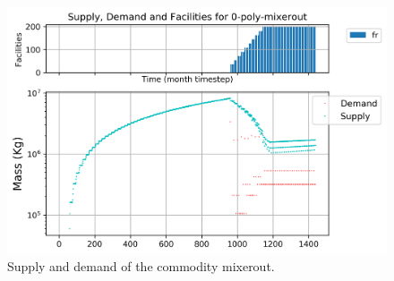 \documentclass[11pt]{article}
\begin{document}
\begin{figure}[H]
	\centering
	\includegraphics[width=\textwidth]{23-figures/0-poly-mixerout.png} 
	\hfill
	\caption{Supply and demand of the commodity mixerout.}
	\label{fig:23-mixerout}
\end{figure}
\end{document}
